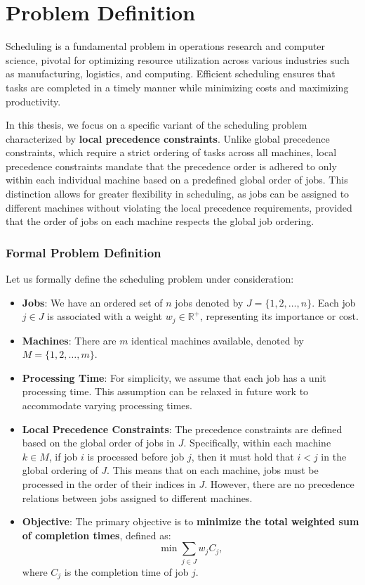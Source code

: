 \chapter{Problem Definition} \label{chap:problem_definition}

Scheduling is a fundamental problem in operations research and computer science, pivotal for optimizing resource utilization across various industries such as manufacturing, logistics, and computing. Efficient scheduling ensures that tasks are completed in a timely manner while minimizing costs and maximizing productivity.

In this thesis, we focus on a specific variant of the scheduling problem characterized by \textbf{local precedence constraints}. Unlike global precedence constraints, which require a strict ordering of tasks across all machines, local precedence constraints mandate that the precedence order is adhered to only within each individual machine based on a predefined global order of jobs. This distinction allows for greater flexibility in scheduling, as jobs can be assigned to different machines without violating the local precedence requirements, provided that the order of jobs on each machine respects the global job ordering.

\subsection*{Formal Problem Definition}

Let us formally define the scheduling problem under consideration:

\begin{itemize}
    \item \textbf{Jobs}: We have an ordered set of $n$ jobs denoted by $J = \{1, 2, \dots, n\}$. Each job $j \in J$ is associated with a weight $w_j \in \mathbb{R}^+$, representing its importance or cost.

    \item \textbf{Machines}: There are $m$ identical machines available, denoted by $M = \{1, 2, \dots, m\}$.

    \item \textbf{Processing Time}: For simplicity, we assume that each job has a unit processing time. This assumption can be relaxed in future work to accommodate varying processing times.

    \item \textbf{Local Precedence Constraints}: The precedence constraints are defined based on the global order of jobs in $J$. Specifically, within each machine $k \in M$, if job $i$ is processed before job $j$, then it must hold that $i < j$ in the global ordering of $J$. This means that on each machine, jobs must be processed in the order of their indices in $J$. However, there are no precedence relations between jobs assigned to different machines.

    \item \textbf{Objective}: The primary objective is to \textbf{minimize the total weighted sum of completion times}, defined as:
    \[
        \min \sum_{j \in J} w_j C_j,
    \]
    where $C_j$ is the completion time of job $j$.
\end{itemize}


